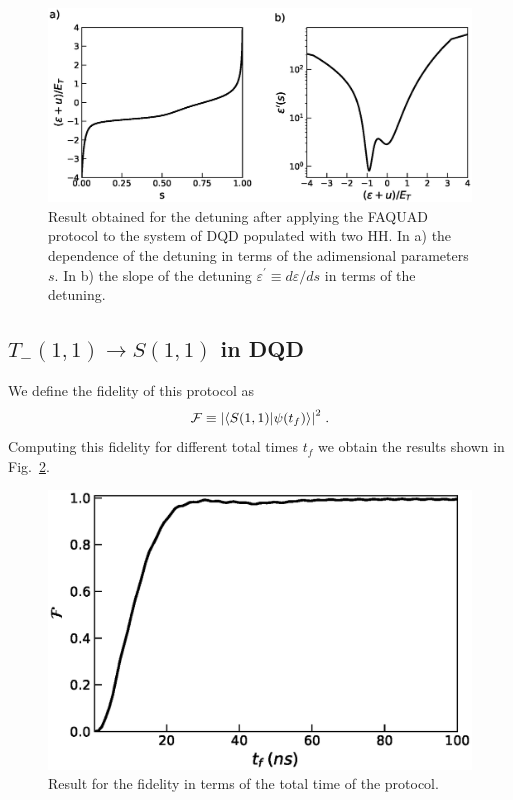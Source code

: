 \documentclass[a4paper,11pt]{article}
\begin{document}
\begin{figure}[!htbp]
	\centering
	\includegraphics[width=1\linewidth]{FAQUAD_detuning_2QD_2HH.eps}
	\caption{Result obtained for the detuning after applying the FAQUAD protocol to the system of DQD populated with two HH. In a) the dependence of the detuning in terms of the adimensional parameters $s$. In b) the slope of the detuning $\varepsilon^\prime\equiv d \varepsilon/d s$ in terms of the detuning.}
	\label{fig:FAQUAD_detuning_2QD_2HH}
\end{figure}
\subsection{\label{Subsec:FAQUAD_DQD}\texorpdfstring{$T_-(1,1)\rightarrow S(1,1)$}{Lg} in DQD}
We define the fidelity of this protocol as
\begin{equation}
	\mathcal{F}\equiv \abs{\braket{S(1,1)}{\psi(t_f)}}^2\; .
\end{equation}
Computing this fidelity for different total times $t_f$ we obtain the results shown in Fig.~\ref{fig:FAQUAD_2QD_Results}.
\begin{figure}[!htbp]
	\centering
	\includegraphics[width=0.7\linewidth]{FAQUAD_2QD_Results.eps}
	\caption{Result for the fidelity in terms of the total time of the protocol.}
	\label{fig:FAQUAD_2QD_Results}
\end{figure}
\end{document}
